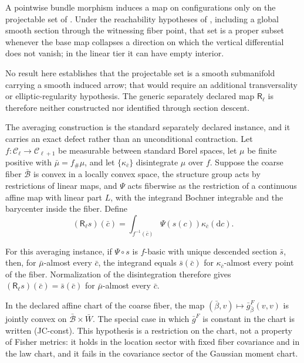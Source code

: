 A pointwise bundle morphism induces a map on configurations only on the
projectable set of .  Under the reachability
hypotheses of , including a global smooth
section through the witnessing fiber point, that set is a proper subset whenever
the base map collapses a direction on which the vertical differential does not
vanish; in the linear tier it can have empty interior.

No result here establishes that the projectable set is a smooth submanifold
carrying a smooth induced arrow; that would require an additional
transversality or elliptic-regularity hypothesis.  The generic separately
declared map $\mathsf R_\ell$ is therefore neither constructed nor identified
through section descent. 

The averaging construction is the standard separately declared instance, and it
carries an exact defect rather than an unconditional contraction.  Let
$f:\mathcal C_\ell\to\mathcal C_{\ell+1}$ be measurable between standard Borel
spaces, let $\mu$ be finite positive with $\bar\mu=f_\#\mu$, and let
$\{\kappa_{\bar c}\}$ disintegrate $\mu$ over $f$.  Suppose the coarse fiber
$\bar{\mathcal B}$ is convex in a locally convex space, the structure group acts
by restrictions of linear maps, and $\Psi$ acts fiberwise as the restriction of
a continuous affine map with linear part $L$, with the integrand Bochner
integrable and the barycenter inside the fiber.  Define
\begin{equation}
\left(\mathsf R_\ell s\right)(\bar c)
=\int_{f^{-1}(\bar c)}\Psi\left(s(c)\right)\kappa_{\bar c}(\mathrm dc).
\label{eq:hist-averaging-coarse-map}
\end{equation}

For this averaging instance, if $\Psi\circ s$ is $f$-basic with unique
descended section $\bar s$, then, for $\bar\mu$-almost every $\bar c$, the
integrand equals $\bar s(\bar c)$ for $\kappa_{\bar c}$-almost every point of
the fiber.  Normalization of the disintegration therefore gives
$(\mathsf R_\ell s)(\bar c)=\bar s(\bar c)$ for $\bar\mu$-almost every
$\bar c$. 

In the declared affine chart of the coarse fiber, the map
$(\bar\beta,v)\mapsto\bar g^F_{\bar\beta}(v,v)$ is jointly convex on
$\bar{\mathcal B}\times\bar W$.  The special case in which $\bar g^F$ is
constant in the chart is written (JC-const).  This hypothesis is a restriction
on the chart, not a property of Fisher metrics: it holds in the location sector
with fixed fiber covariance and in the law chart, and it fails in the covariance
sector of the Gaussian moment chart.  

